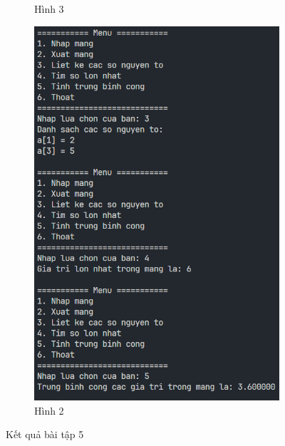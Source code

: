 \documentclass[a4paper,12pt]{report}
\begin{document}
\begin{figure}[!ht]
\begin{subfigure}{0.32\textwidth}
		\caption{Hình 3}
	\end{subfigure}
	\hfill
	\begin{subfigure}{0.4\textwidth}
		\centering
		\includegraphics[width=1\textwidth]{imgs/5_2.png}
		\caption{Hình 2}
	\end{subfigure}
	\caption{Kết quả bài tập 5}
\end{figure}
\end{document}
